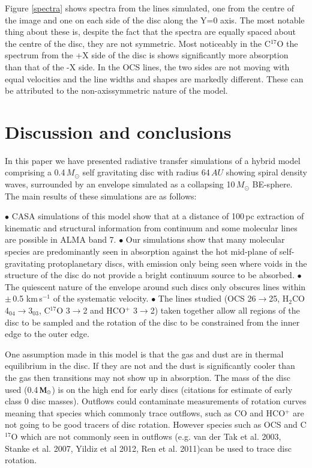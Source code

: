 \documentclass[useAMS,usenatbib]{mn2e}
\begin{document}
Figure \ref{spectra} shows spectra from the lines simulated, one from the centre of the image and one on each side of the disc along the Y=0 axis. The most notable thing about these is, despite the fact that the spectra are equally spaced about the centre of the disc, they are not symmetric. Most noticeably in the C$^{17}$O the spectrum from the +X side of the disc is shows significantly more absorption than that of the -X side. In the OCS lines, the two sides are not moving with equal velocities and the line widths and shapes are markedly different. These can be attributed to the non-axissymmetric nature of the model.

\section{Discussion and conclusions} \label{sec:discussion}

In this paper we have presented radiative transfer simulations of a hybrid model comprising a 0.4$\, M_\odot$ self gravitating disc with radius 64$\,AU$ showing spiral density waves, surrounded by an envelope simulated as a collapsing 10$\,M_\odot$ BE-sphere. The main results of these simulations are as follows:\newline

$\bullet$ CASA simulations of this model show that at a distance of 100$\,$pc extraction of kinematic and structural information from continuum and some molecular lines are possible in ALMA band 7.\newline 
$\bullet$ Our simulations show that many molecular species are predominantly seen in absorption against the hot mid-plane of self-gravitating protoplanetary discs, with emission only being seen where voids in the structure of the disc do not provide a bright continuum source to be absorbed.\newline 
$\bullet$ The quiescent nature of the envelope around such discs only obscures lines within $\pm\,$0.5 km$\,$s$^{-1}$ of the systematic velocity.\newline 
$\bullet$ The lines studied (OCS 26$\rightarrow$25, H$_2$CO 4$_{04}$$\rightarrow$3$_{03}$, C$^{17}$O 3$\rightarrow$2 and HCO$^+$ 3$\rightarrow$2) taken together allow all regions of the disc to be sampled and the rotation of the disc to be constrained from the inner edge to the outer edge.\newline 


One assumption made in this model is that the gas and dust are in thermal equilibrium in the disc. If they are not and the dust is significantly cooler than the gas then transitions may not show up in absorption.\newline
The mass of the disc used (0.4$\,\rm{M}_\odot$) is on the high end for early discs (citations for estimate of early class 0 disc masses). Outflows could contaminate measurements of rotation curves meaning that species  which commonly trace outflows, such as CO and HCO$^+$ are not going to be good tracers of disc rotation. However species such as OCS and C$^{17}$O which are not commonly seen in outflows (e.g. van der Tak et al. 2003, Stanke et al. 2007, Yildiz et al 2012, Ren et al. 2011)can be used to trace disc rotation.\newline
\end{document}
